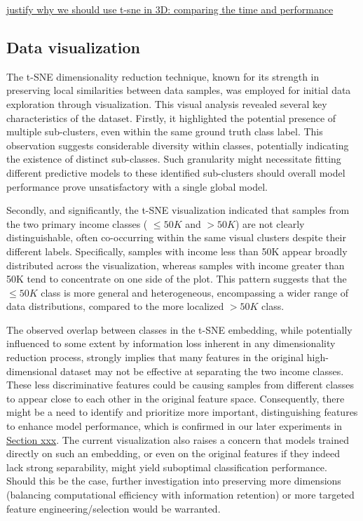 \documentclass{article}
\begin{document}


\underline{justify why we should use t-sne in 3D: comparing the time and performance}


\subsection{Data visualization}



The t-SNE dimensionality reduction technique, known for its strength in preserving local similarities between data samples, was employed for initial data exploration through visualization. This visual analysis revealed several key characteristics of the dataset. Firstly, it highlighted the potential presence of multiple sub-clusters, even within the same ground truth class label. This observation suggests considerable diversity within classes, potentially indicating the existence of distinct sub-classes. Such granularity might necessitate fitting different predictive models to these identified sub-clusters should overall model performance prove unsatisfactory with a single global model.

Secondly, and significantly, the t-SNE visualization indicated that samples from the two primary income classes ( $\le50K$ and $>50K$) are not clearly distinguishable, often co-occurring within the same visual clusters despite their different labels. Specifically, samples with income less than 50K appear broadly distributed across the visualization, whereas samples with income greater than 50K tend to concentrate on one side of the plot. This pattern suggests that the $\le50K$ class is more general and heterogeneous, encompassing a wider range of data distributions, compared to the more localized $>50K$ class.

The observed overlap between classes in the t-SNE embedding, while potentially influenced to some extent by information loss inherent in any dimensionality reduction process, strongly implies that many features in the original high-dimensional dataset may not be effective at separating the two income classes. These less discriminative features could be causing samples from different classes to appear close to each other in the original feature space. Consequently, there might be a need to identify and prioritize more important, distinguishing features to enhance model performance, which is confirmed in our later experiments in \underline{Section xxx}. The current visualization also raises a concern that models trained directly on such an embedding, or even on the original features if they indeed lack strong separability, might yield suboptimal classification performance. Should this be the case, further investigation into preserving more dimensions (balancing computational efficiency with information retention) or more targeted feature engineering/selection would be warranted.
\end{document}
